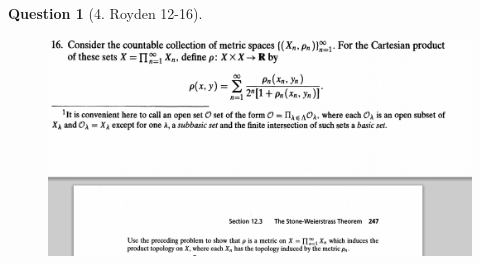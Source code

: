 \documentclass{article} %
\theoremstyle{quest}
\newtheorem*{question}{Question}
\begin{document}
\begin{question}[4. Royden 12-16]
\hfill \\
\begin{figure}[H]
  \centering
    \includegraphics[width=1\textwidth]{12-16}
\end{figure}
\end{question}
\end{document}
